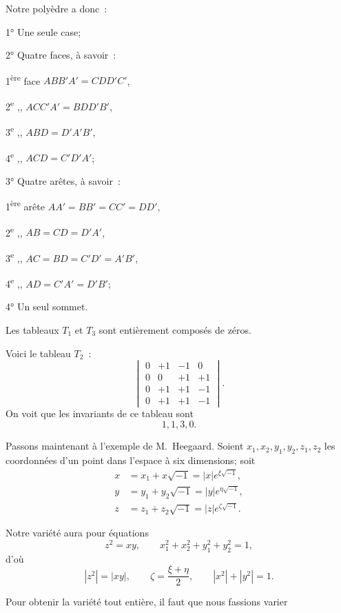 \documentclass{article}
\begin{document}
Notre polyèdre a donc~:

1° Une seule case;

2° Quatre faces, à savoir~:

1\textsuperscript{ère} face $ABB'A' = CDD'C'$,

2\textsuperscript{e} ,, $ACC'A' = BDD'B'$,

3\textsuperscript{e} ,, $ABD = D'A'B'$,

4\textsuperscript{e} ,, $ACD = C'D'A'$;

3° Quatre arêtes, à savoir~:

1\textsuperscript{ère} arête $AA' = BB' = CC' = DD'$,

2\textsuperscript{e} ,, $AB = CD = D'A'$,

3\textsuperscript{e} ,, $AC = BD = C'D' = A'B'$,

4\textsuperscript{e} ,, $AD = C'A' = D'B'$;

4° Un seul sommet.

Les tableaux $T_{1}$ et $T_{3}$ sont entièrement composés de zéros.

Voici le tableau $T_{2}$~:
\[ \begin{vmatrix} 0 & +1 & -1 & 0 \\[1ex] 0 & 0 & +1 & +1 \\[1ex] 0 & +1 & +1 & -1 \\[1ex] 0 & +1 & +1 & -1 \end{vmatrix}. \]
On voit que les invariants de ce tableau sont
\[ 1, 1, 3, 0. \]

Passons maintenant à l'exemple de M.~Heegaard. Soient $x_{1}, x_{2}, y_{1}, y_{2}, z_{1}, z_{2}$ les coordonnées d'un point dans l'espace à six dimensions; soit
\[ \begin{aligned} x &= x_{1} + x\sqrt{-1} = |x| e^{\xi\sqrt{-1}},\\ y &= y_{1} + y_{2}\sqrt{-1} = |y| e^{\eta\sqrt{-1}},\\ z &= z_{1} + z_{2}\sqrt{-1} = |z| e^{\zeta\sqrt{-1}}. \end{aligned} \]

Notre variété aura pour équations
\[ z^{2} = xy, \qquad x^{2}_{1} + x^{2}_{2} + y^{2}_{1} + y^{2}_{2} = 1, \]
d'où
\[ |z^{2}| = |xy|, \qquad \zeta = \frac{\xi+\eta}{2}, \qquad |x^{2}| + |y^{2}| = 1. \]

Pour obtenir la variété tout entière, il faut que nous fassions varier
\end{document}
